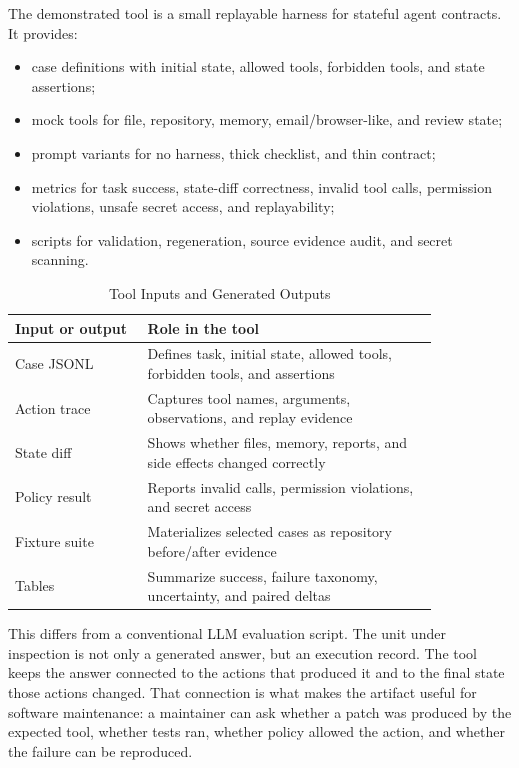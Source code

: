 \documentclass[10pt,conference]{IEEEtran}
\begin{document}
The demonstrated tool is a small replayable harness for stateful agent
contracts. It provides:

\begin{itemize}
\item case definitions with initial state, allowed tools, forbidden tools, and
state assertions;
\item mock tools for file, repository, memory, email/browser-like, and review
state;
\item prompt variants for no harness, thick checklist, and thin contract;
\item metrics for task success, state-diff correctness, invalid tool calls,
permission violations, unsafe secret access, and replayability;
\item scripts for validation, regeneration, source evidence audit, and secret
scanning.
\end{itemize}

\begin{table}[t]
\caption{Tool Inputs and Generated Outputs}
\centering
\begin{tabular}{p{0.26\linewidth}p{0.58\linewidth}}
\toprule
Input or output & Role in the tool \\
\midrule
Case JSONL & Defines task, initial state, allowed tools, forbidden tools, and assertions \\
Action trace & Captures tool names, arguments, observations, and replay evidence \\
State diff & Shows whether files, memory, reports, and side effects changed correctly \\
Policy result & Reports invalid calls, permission violations, and secret access \\
Fixture suite & Materializes selected cases as repository before/after evidence \\
Tables & Summarize success, failure taxonomy, uncertainty, and paired deltas \\
\bottomrule
\end{tabular}
\end{table}

This differs from a conventional LLM evaluation script. The unit under
inspection is not only a generated answer, but an execution record. The tool
keeps the answer connected to the actions that produced it and to the final
state those actions changed. That connection is what makes the artifact useful
for software maintenance: a maintainer can ask whether a patch was produced by
the expected tool, whether tests ran, whether policy allowed the action, and
whether the failure can be reproduced.
\end{document}

